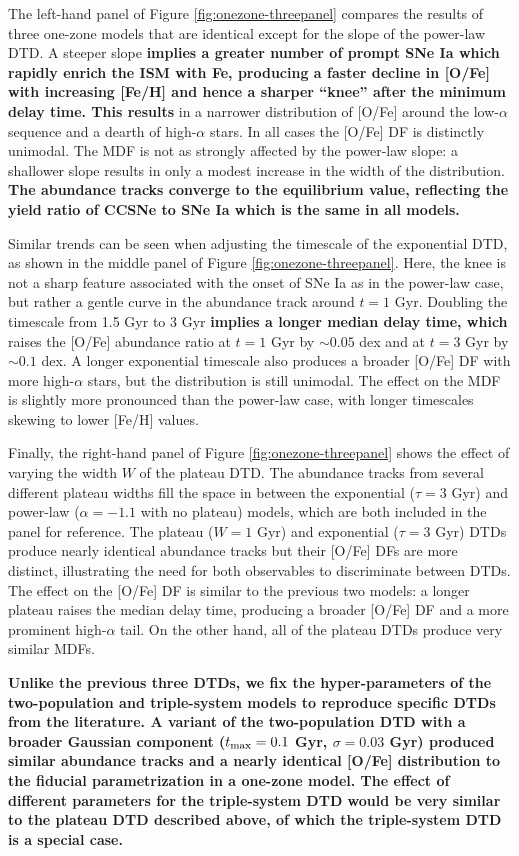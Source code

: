\documentclass[twocolumn,twocolappendix,linenumbers]{aastex631}
\begin{document}
The left-hand panel of Figure \ref{fig:onezone-threepanel} compares the results of three one-zone models that are identical except for the slope of the power-law DTD. A steeper slope {\bf implies a greater number of prompt SNe Ia which rapidly enrich the ISM with Fe, producing a faster decline in [O/Fe] with increasing [Fe/H] and hence a sharper ``knee'' after the minimum delay time. This results} in a narrower distribution of [O/Fe] around the low-$\alpha$ sequence and a dearth of high-$\alpha$ stars. In all cases the [O/Fe] DF is distinctly unimodal. The MDF is not as strongly affected by the power-law slope: a shallower slope results in only a modest increase in the width of the distribution. {\bf The abundance tracks converge to the equilibrium value, reflecting the yield ratio of CCSNe to SNe Ia which is the same in all models.}

Similar trends can be seen when adjusting the timescale of the exponential DTD, as shown in the middle panel of Figure \ref{fig:onezone-threepanel}. Here, the knee is not a sharp feature associated with the onset of SNe Ia as in the power-law case, but rather a gentle curve in the abundance track around $t=1$ Gyr. Doubling the timescale from 1.5 Gyr to 3 Gyr {\bf implies a longer median delay time, which} raises the [O/Fe] abundance ratio at $t=1$ Gyr by $\sim0.05$ dex and at $t=3$ Gyr by $\sim0.1$ dex. A longer exponential timescale also produces a broader [O/Fe] DF with more high-$\alpha$ stars, but the distribution is still unimodal. The effect on the MDF is slightly more pronounced than the power-law case, with longer timescales skewing to lower [Fe/H] values.

Finally, the right-hand panel of Figure \ref{fig:onezone-threepanel} shows the effect of varying the width $W$ of the plateau DTD. The abundance tracks from several different plateau widths fill the space in between the exponential ($\tau=3$ Gyr) and power-law ($\alpha=-1.1$ with no plateau) models, which are both included in the panel for reference. The plateau ($W=1$ Gyr) and exponential ($\tau=3$ Gyr) DTDs produce nearly identical abundance tracks but their [O/Fe] DFs are more distinct, illustrating the need for both observables to discriminate between DTDs. The effect on the [O/Fe] DF is similar to the previous two models: a longer plateau raises the median delay time, producing a broader [O/Fe] DF and a more prominent high-$\alpha$ tail. On the other hand, all of the plateau DTDs produce very similar MDFs.

{\bf Unlike the previous three DTDs, we fix the hyper-parameters of the two-population and triple-system models to reproduce specific DTDs from the literature. A variant of the two-population DTD with a broader Gaussian component ($t_{\rm max}=0.1$ Gyr, $\sigma=0.03$ Gyr) produced similar abundance tracks and a nearly identical [O/Fe] distribution to the fiducial parametrization in a one-zone model. The effect of different parameters for the triple-system DTD would be very similar to the plateau DTD described above, of which the triple-system DTD is a special case.}
\end{document}
